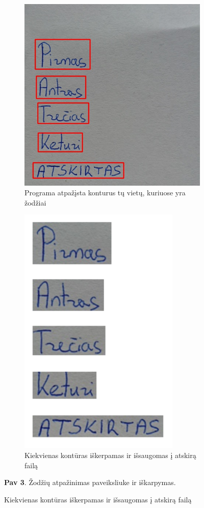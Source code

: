 \documentclass[a4paper,12pt]{article}
\begin{document}
\begin{figure}[H]
\centering
\begin{subfigure}{.5\textwidth}
  \centering
  \includegraphics[height=.9\linewidth]{img/3.1.png}
  \caption{Programa atpažįsta konturus tų vietų, kuriuose yra žodžiai}
\end{subfigure}%
\begin{subfigure}{.5\textwidth}
  \centering
  \includegraphics[height=.9\linewidth]{img/3.2.png}
  \caption{Kiekvienas kontūras iškerpamas ir išsaugomas į atskirą failą}
\end{subfigure}
\textbf{Pav 3}. Žodžių atpažinimas paveiksliuke ir iškarpymas.\\
\end{figure}
\end{document}

